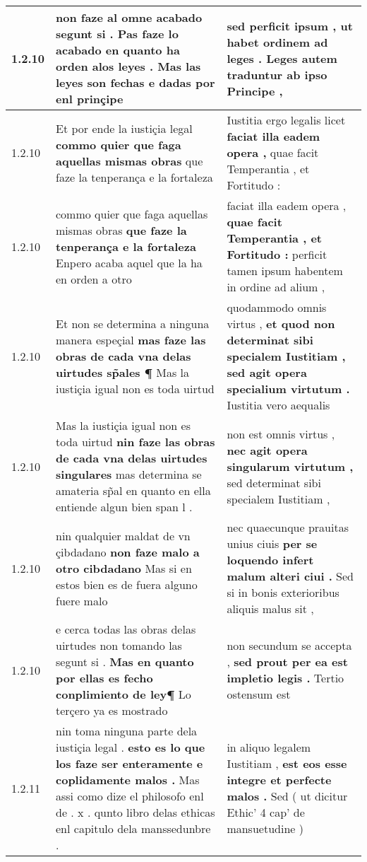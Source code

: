 \begin{tabular}{|p{1cm}|p{6.5cm}|p{6.5cm}|}
1.2.10 & non faze al omne acabado segunt si . \textbf{ Pas faze lo acabado en quanto ha orden alos leyes . } Mas las leyes son fechas e dadas por enl prinçipe & sed perficit ipsum , \textbf{ ut habet ordinem ad leges . } Leges autem traduntur ab ipso Principe , \\\hline
1.2.10 & Et por ende la iustiçia legal \textbf{ commo quier que faga aquellas mismas obras } que faze la tenperança e la fortaleza & Iustitia ergo legalis licet \textbf{ faciat illa eadem opera , } quae facit Temperantia , et Fortitudo : \\\hline
1.2.10 & commo quier que faga aquellas mismas obras \textbf{ que faze la tenperança e la fortaleza } Enpero acaba aquel que la ha en orden a otro & faciat illa eadem opera , \textbf{ quae facit Temperantia , et Fortitudo : } perficit tamen ipsum habentem in ordine ad alium , \\\hline
1.2.10 & Et non se determina a ninguna manera espeçial \textbf{ mas faze las obras de cada vna delas uirtudes sp̃ales ¶ } Mas la iustiçia igual non es toda uirtud & quodammodo omnis virtus , \textbf{ et quod non determinat sibi specialem Iustitiam , sed agit opera specialium virtutum . } Iustitia vero aequalis \\\hline
1.2.10 & Mas la iustiçia igual non es toda uirtud \textbf{ nin faze las obras de cada vna delas uirtudes singulares } mas determina se amateria sp̃al en quanto en ella entiende algun bien span l . & non est omnis virtus , \textbf{ nec agit opera singularum virtutum , } sed determinat sibi specialem Iustitiam , \\\hline
1.2.10 & nin qualquier maldat de vn çibdadano \textbf{ non faze malo a otro cibdadano } Mas si en estos bien es de fuera alguno fuere malo & nec quaecunque prauitas unius ciuis \textbf{ per se loquendo infert malum alteri ciui . } Sed si in bonis exterioribus aliquis malus sit , \\\hline
1.2.10 & e cerca todas las obras delas uirtudes non tomando las segunt si . \textbf{ Mas en quanto por ellas es fecho conplimiento de ley¶ } Lo terçero ya es mostrado & non secundum se accepta , \textbf{ sed prout per ea est impletio legis . } Tertio ostensum est \\\hline
1.2.11 & nin toma ninguna parte dela iustiçia legal . \textbf{ esto es lo que los faze ser enteramente e coplidamente malos . } Mas assi como dize el philosofo enl de . x . qunto libro delas ethicas enl capitulo dela manssedunbre . & in aliquo legalem Iustitiam , \textbf{ est eos esse integre et perfecte malos . } Sed ( ut dicitur Ethic’ 4 cap’ de mansuetudine ) \\\hline

\end{tabular}
